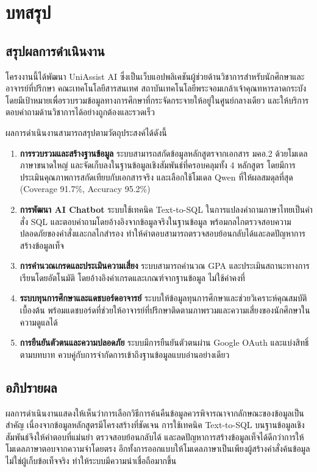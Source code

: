 \chapter{บทสรุป}
\label{chapter:conclusion}

\section{สรุปผลการดำเนินงาน}

โครงงานนี้ได้พัฒนา UniAssist AI ซึ่งเป็นเว็บแอปพลิเคชันผู้ช่วยด้านวิชาการสำหรับนักศึกษาและอาจารย์ที่ปรึกษา คณะเทคโนโลยีสารสนเทศ สถาบันเทคโนโลยีพระจอมเกล้าเจ้าคุณทหารลาดกระบัง โดยมีเป้าหมายเพื่อรวบรวมข้อมูลทางการศึกษาที่กระจัดกระจายให้อยู่ในศูนย์กลางเดียว และให้บริการตอบคำถามด้านวิชาการได้อย่างถูกต้องและรวดเร็ว

ผลการดำเนินงานสามารถสรุปตามวัตถุประสงค์ได้ดังนี้

\begin{enumerate}
    \item \textbf{การรวบรวมและสร้างฐานข้อมูล} ระบบสามารถสกัดข้อมูลหลักสูตรจากเอกสาร มคอ.2 ด้วยโมเดลภาษาขนาดใหญ่ และจัดเก็บลงในฐานข้อมูลเชิงสัมพันธ์ที่ครอบคลุมทั้ง 4 หลักสูตร โดยมีการประเมินคุณภาพการสกัดเทียบกับเอกสารจริง และเลือกใช้โมเดล Qwen ที่ให้ผลสมดุลที่สุด (Coverage 91.7\%, Accuracy 95.2\%)
    \item \textbf{การพัฒนา AI Chatbot} ระบบใช้เทคนิค Text-to-SQL ในการแปลงคำถามภาษาไทยเป็นคำสั่ง SQL และตอบคำถามโดยอ้างอิงจากข้อมูลจริงในฐานข้อมูล พร้อมกลไกตรวจสอบความปลอดภัยของคำสั่งและกลไกสำรอง ทำให้คำตอบสามารถตรวจสอบย้อนกลับได้และลดปัญหาการสร้างข้อมูลเท็จ
    \item \textbf{การคำนวณเกรดและประเมินความเสี่ยง} ระบบสามารถคำนวณ GPA และประเมินสถานะทางการเรียนโดยอัตโนมัติ โดยอ้างอิงค่าเกรดและเกณฑ์จากฐานข้อมูล ไม่ใช้ค่าคงที่
    \item \textbf{ระบบทุนการศึกษาและแดชบอร์ดอาจารย์} ระบบให้ข้อมูลทุนการศึกษาและช่วยวิเคราะห์คุณสมบัติเบื้องต้น พร้อมแดชบอร์ดที่ช่วยให้อาจารย์ที่ปรึกษาติดตามภาพรวมและความเสี่ยงของนักศึกษาในความดูแลได้
    \item \textbf{การยืนยันตัวตนและความปลอดภัย} ระบบมีการยืนยันตัวตนผ่าน Google OAuth และแบ่งสิทธิ์ตามบทบาท ควบคู่กับการจำกัดการเข้าถึงฐานข้อมูลแบบอ่านอย่างเดียว
\end{enumerate}

\section{อภิปรายผล}

ผลการดำเนินงานแสดงให้เห็นว่าการเลือกวิธีการค้นคืนข้อมูลควรพิจารณาจากลักษณะของข้อมูลเป็นสำคัญ เนื่องจากข้อมูลหลักสูตรมีโครงสร้างที่ชัดเจน การใช้เทคนิค Text-to-SQL บนฐานข้อมูลเชิงสัมพันธ์จึงให้คำตอบที่แม่นยำ ตรวจสอบย้อนกลับได้ และลดปัญหาการสร้างข้อมูลเท็จได้ดีกว่าการให้โมเดลภาษาตอบจากความจำโดยตรง อีกทั้งการออกแบบให้โมเดลภาษาเป็นเพียงผู้สร้างคำสั่งค้นข้อมูล ไม่ใช่ผู้เก็บข้อเท็จจริง ทำให้ระบบมีความน่าเชื่อถือมากขึ้น

